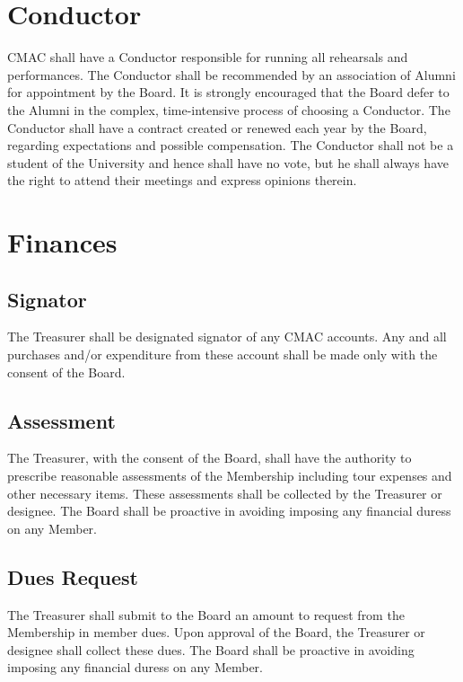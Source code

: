 \documentclass{article}
\begin{document}
\section{Conductor} \label{conductor}

CMAC shall have a Conductor responsible for running all rehearsals and
performances. The Conductor shall be recommended by an association of Alumni for
appointment by the Board. It is strongly encouraged that the Board defer to the
Alumni in the complex, time-intensive process of choosing a Conductor.  The
Conductor shall have a contract created or renewed each year by the Board,
regarding expectations and possible compensation. The Conductor shall not be a
student of the University and hence shall have no vote, but he shall always have
the right to attend their meetings and express opinions therein.

\section{Finances}

\subsection{Signator}

The Treasurer shall be designated signator of any CMAC accounts. Any and all
purchases and/or expenditure from these account shall be made only with the
consent of the Board.

\subsection{Assessment}

The Treasurer, with the consent of the Board, shall have the authority
to prescribe reasonable assessments of the Membership including
tour expenses and other necessary items. These assessments shall be
collected by the Treasurer or designee. The Board shall be proactive in avoiding
imposing any financial duress on any Member.

\subsection{Dues Request}

The Treasurer shall submit to the Board an amount to request from
the Membership in member dues. Upon approval of the Board, the Treasurer
or designee shall collect these dues. The Board shall be proactive in avoiding
imposing any financial duress on any Member.
\end{document}
